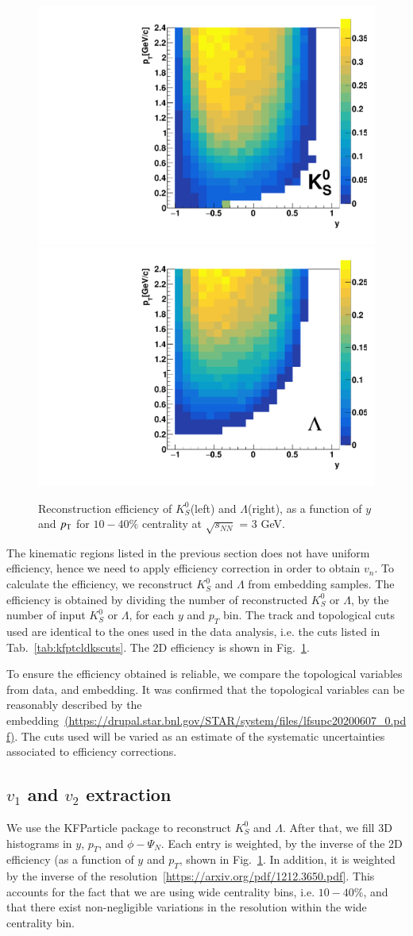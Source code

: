 \begin{figure}[h]
\includegraphics[width=0.49\linewidth]{chapterX/fig/ks_efficiency_v15.pdf}
\includegraphics[width=0.49\linewidth]{chapterX/fig/ld_efficiency_v15.pdf}
\caption{Reconstruction efficiency of $K^0_S$(left) and $\Lambda$(right), as a function of $y$ and $p_{\rm{T}}$ for $10-40\%$ centrality at $\sqrt{s_{NN}}$ = 3 GeV.}
\label{ldks_eff}
\end{figure}

The kinematic regions listed in the previous section does not have uniform efficiency, hence we need to apply efficiency correction in order to obtain $v_n$. To calculate the efficiency, we reconstruct $K^0_S$ and $\Lambda$ from embedding samples. The efficiency is obtained by dividing the number of reconstructed 
$K^0_S$ or $\Lambda$, by the number of input $K^0_S$ or $\Lambda$, for each $y$ and $p_{T}$ bin. The track and topological cuts used are identical to the ones used in the data analysis, i.e. the cuts listed in Tab.~\ref{tab:kfptcldkscuts}. The 2D efficiency is shown in Fig.~\ref{ldks_eff}. 

To ensure the efficiency obtained is reliable, we compare the topological variables from data, and embedding. It was confirmed that the topological variables can be reasonably described by the embedding~\url{(https://drupal.star.bnl.gov/STAR/system/files/lfsupc20200607\_0.pdf)}. The cuts used will be varied as an estimate of the systematic uncertainties associated to efficiency corrections.


\subsection{$v_1$ and $v_2$ extraction}
We use the KFParticle package to reconstruct $K^0_S$ and $\Lambda$. After that, we fill 3D histograms in $y$, $p_{T}$, and $\phi-\Psi_{N}$. Each entry is weighted, by the inverse of the 2D efficiency (as a function of $y$ and $p_{T}$, shown in Fig.~\ref{ldks_eff}. In addition, it is weighted by the inverse of the resolution~\ref{https://arxiv.org/pdf/1212.3650.pdf}. This accounts for the fact that we are using wide centrality bins, i.e. $10-40\%$, and that there exist non-negligible variations in the resolution within the wide centrality bin. 

